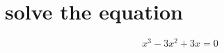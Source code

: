 \documentclass{article}
\begin{document}
\section{solve the equation}

\begin{equation*}
  x^3 -3x^2 + 3x = 0
\end{equation*}
\end{document}
